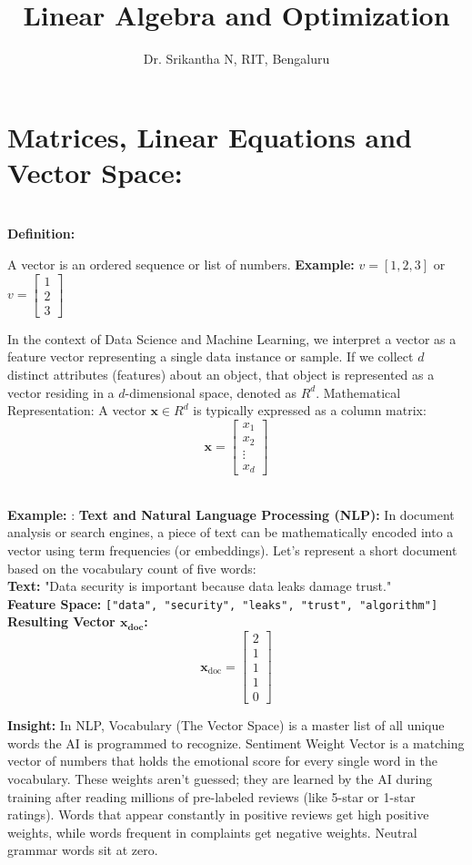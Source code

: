 \documentclass[DIV=20,oneside]{scrartcl}
\title{Linear Algebra and Optimization }
\author{Dr. Srikantha N, RIT, Bengaluru}
\newcommand{\insight}[1]{%
	\begin{tcolorbox}[
		colback=black!20,
		colframe=black,
		boxrule=0.5pt,
		arc=2mm]
		\textbf{Insight: } #1
	\end{tcolorbox}
}
\newcommand{\example}{
	\noindent\textbf{\\Example: }
}
\newcommand{\deff}{
	\noindent\textbf{\\Definition: }
}
\begin{document}
	\date{}
	\maketitle
	
	\section{Matrices, Linear Equations and Vector Space:}
	\deff
	A vector is an ordered sequence or list of numbers. \textbf{Example: } $v=[1,2,3]$ or $v = \begin{bmatrix} 1 \\ 2 \\ 3 \end{bmatrix}$
	\par In the context of Data Science and Machine Learning, we interpret a vector as a feature vector representing a single data instance or sample. If we collect $d$ distinct attributes (features) about an object, that object is represented as a vector residing in a $d$-dimensional space, denoted as ${R}^d$. Mathematical Representation: A vector $\mathbf{x} \in {R}^d$ is typically expressed as a column matrix:$$\mathbf{x} = \begin{bmatrix} x_1 \\ x_2 \\ \vdots \\ x_d \end{bmatrix}$$
	\example: \textbf{Text and Natural Language Processing (NLP):}
	In document analysis or search engines, a piece of text can be mathematically encoded into a vector using term frequencies (or embeddings). Let's represent a short document based on the vocabulary count of five words:
	\\
	\textbf{Text: }"Data security is important because data leaks damage trust."
	\\
	\textbf{Feature Space: }\texttt{["data", "security", "leaks", "trust", "algorithm"]}
	\\
	\textbf{Resulting Vector $\mathbf{x_{\text{doc}}}$:}
	$$\mathbf{x}_{\text{doc}} = \begin{bmatrix} 2 \\ 1 \\ 1 \\ 1 \\ 0 \end{bmatrix}$$
	\insight{In NLP, Vocabulary (The Vector Space) is a master list of all unique words the AI is programmed to recognize. Sentiment Weight Vector is a matching vector of numbers that holds the emotional score for every single word in the vocabulary. These weights aren't guessed; they are learned by the AI during training after reading millions of pre-labeled reviews (like 5-star or 1-star ratings). Words that appear constantly in positive reviews get high positive weights, while words frequent in complaints get negative weights. Neutral grammar words sit at zero.}
\end{document}
